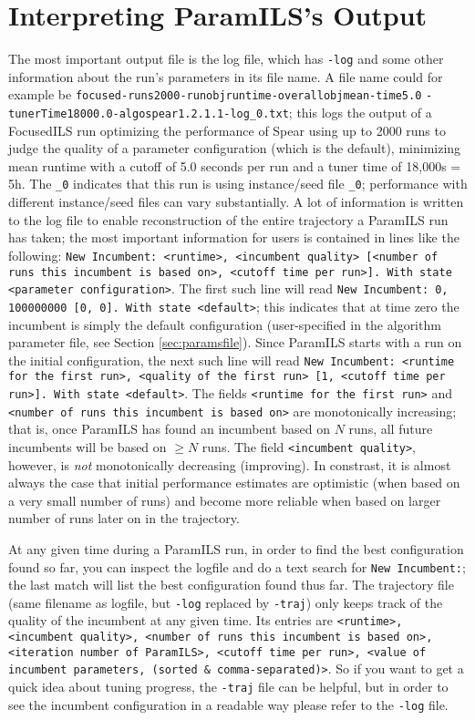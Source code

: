 \documentclass[10pt,letterpaper,twoside]{article}
\begin{document}
\section{Interpreting ParamILS's Output}\label{sec:output}
The most important output file is the log file, which has \texttt{-log} and some other information about the run's parameters in its file name. A file name could for example be \texttt{focused-runs2000-runobjruntime-overallobjmean-time5.0} \texttt{-tunerTime18000.0-algospear1.2.1.1-log\_0.txt}; this logs the output of a FocusedILS run optimizing the performance of Spear using up to 2000 runs to judge the quality of a parameter configuration (which is the default), minimizing mean runtime with a cutoff of 5.0 seconds per run and a tuner time of 18,000s = 5h. The \texttt{\_0} indicates that this run is using instance/seed file \texttt{\_0}; performance with different instance/seed files can vary substantially.
A lot of information is written to the log file to enable reconstruction of the entire trajectory a ParamILS run has taken; the most important information for users is contained in lines like the following:
\texttt{New Incumbent: <runtime>, <incumbent quality> [<number of runs this incumbent is based on>, <cutoff time per run>]. With state <parameter configuration>}.
The first such line will read \texttt{New Incumbent: 0, 100000000 [0, 0]. With state <default>}; this indicates that at time zero the incumbent is simply the default configuration (user-specified in the algorithm parameter file, see Section \ref{sec:paramsfile}).
Since ParamILS starts with a run on the initial configuration, the next such line will read 
\texttt{New Incumbent: <runtime for the first run>, <quality of the first run> [1, <cutoff time per run>]. With state <default>}.
The fields \texttt{<runtime for the first run>} and \texttt{<number of runs this incumbent is based on>} are monotonically increasing; that is, once ParamILS has found an incumbent based on $N$ runs, all future incumbents will be based on $\ge N$ runs.
The field \texttt{<incumbent quality>}, however, is \emph{not} monotonically decreasing (improving). In constrast, it is almost always the case that initial performance estimates are optimistic (when based on a very small number of runs) and become more reliable when based on larger number of runs later on in the trajectory.

At any given time during a ParamILS run, in order to find the best configuration found so far, you can inspect the logfile and do a text search for \texttt{New Incumbent:}; the last match will list the best configuration found thus far.
The trajectory file (same filename as logfile, but \texttt{-log} replaced by \texttt{-traj}) only keeps track of the quality of the incumbent at any given time.
Its entries are \texttt{<runtime>, <incumbent quality>, <number of runs this incumbent is based on>, <iteration number of ParamILS>, <cutoff time per run>, <value of incumbent parameters, (sorted \& comma-separated)>}. So if you want to get a quick idea about tuning progress, the \texttt{-traj} file can be helpful, but in order to see the incumbent configuration in a readable way please refer to the \texttt{-log} file.
\end{document}
